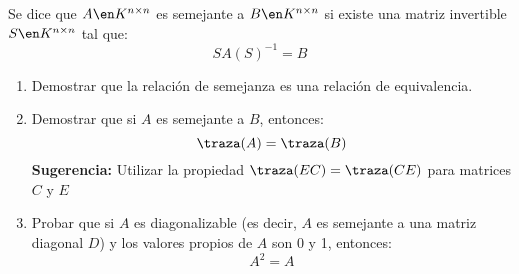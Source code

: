 \begin{enunciado}{\ejExtra} 
  Se dice que $A \en K^{n \times n}$ es semejante a $B \en K^{n \times n}$ si existe una matriz invertible $S \en K^{n \times n}$ tal que:
  $$
    SA(S)^{-1} = B
  $$
  \begin{enumerate}[label=\arabic*.]
    \item Demostrar que la relación de semejanza es una relación de equivalencia.
    \item Demostrar que si $A$ es semejante a $B$, entonces:
          $$
            \traza(A) = \traza(B)
          $$
          \textbf{Sugerencia:} Utilizar la propiedad $\traza(EC) = \traza(CE)$ para matrices $C$ y $E$

    \item Probar que si $A$ es diagonalizable (es decir, $A$ es semejante a una matriz diagonal $D$) y los valores propios de
          $A$ son 0 y 1, entonces:
          $$
            A^2 = A
          $$
  \end{enumerate}
\end{enunciado}

